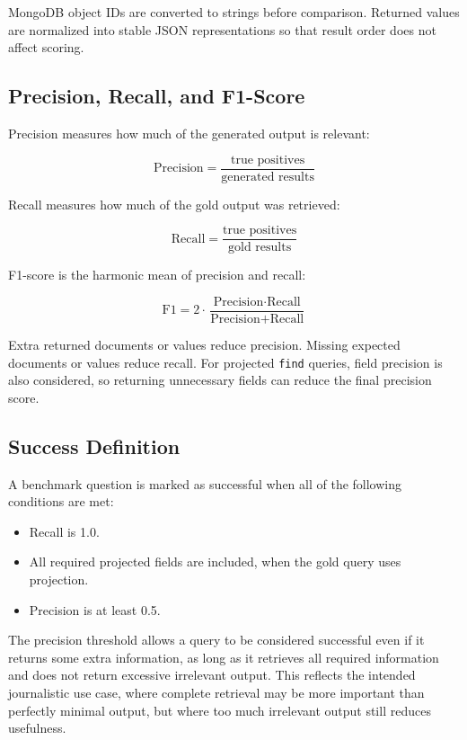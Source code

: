 MongoDB object IDs are converted to strings before comparison. Returned values are normalized into stable JSON representations so that result order does not affect scoring.

\subsection{Precision, Recall, and F1-Score}

Precision measures how much of the generated output is relevant:

\[
\text{Precision} = \frac{\text{true positives}}{\text{generated results}}
\]

Recall measures how much of the gold output was retrieved:

\[
\text{Recall} = \frac{\text{true positives}}{\text{gold results}}
\]

F1-score is the harmonic mean of precision and recall:

\[
\text{F1} = 2 \cdot \frac{\text{Precision} \cdot \text{Recall}}{\text{Precision} + \text{Recall}}
\]

Extra returned documents or values reduce precision. Missing expected documents or values reduce recall. For projected \texttt{find} queries, field precision is also considered, so returning unnecessary fields can reduce the final precision score.

\subsection{Success Definition}

A benchmark question is marked as successful when all of the following conditions are met:

\begin{itemize}
    \item Recall is 1.0.
    \item All required projected fields are included, when the gold query uses projection.
    \item Precision is at least 0.5.
\end{itemize}

The precision threshold allows a query to be considered successful even if it returns some extra information, as long as it retrieves all required information and does not return excessive irrelevant output. This reflects the intended journalistic use case, where complete retrieval may be more important than perfectly minimal output, but where too much irrelevant output still reduces usefulness.

